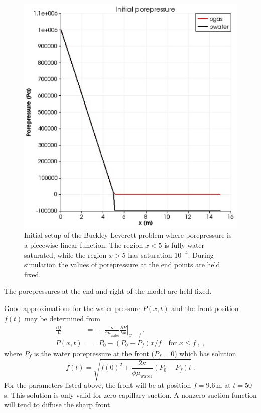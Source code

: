 \documentclass[]{scrreprt}
\begin{document}
\begin{figure}[htb]
\begin{center}
\includegraphics[width=12cm]{bl2_initial.eps}
\caption{Initial setup of the Buckley-Leverett problem where
  porepressure is a piecewise linear function.  The region
$x<5$ is fully water saturated, while the region $x>5$ has saturation
  $10^{-4}$.  During simulation the values of porepressure at the end
  points are held fixed.}
\label{bl2_setup.figa}
\end{center}
\end{figure}

The porepressures at the end and right of the model are held fixed.

Good approximations for the water pressure $P(x,t)$
and the front position $f(t)$ may be determined from
\begin{eqnarray}
\frac{{\mathrm d} f}{{\mathrm d} t} & = & -\frac{\kappa}{\phi\mu_{\mathrm{water}}}
\left.\frac{\partial  P}{\partial x}\right|_{x = f} \ , \nonumber \\
P(x,t) & = & P_{0} - (P_{0}-P_{f})x/f \ \ \ \mbox{ for } x\leq f  \ ,
\ ,
\label{eqn.predicted.bl2.posn.eqna}
\end{eqnarray}
where $P_{f}$ is the water porepressure at the front ($P_{f}=0$)
which has solution
\begin{equation}
f(t) = \sqrt{f(0)^{2} + \frac{2\kappa}{\phi\mu_{\mathrm{water}}}(P_{0}-P_{f})t} \ .
\end{equation}
For the parameters listed above, the front will be at position
$f=9.6$\,m at $t=50$\,s.  This solution is only valid for zero
capillary suction.  A nonzero suction function will tend to diffuse
the sharp front.
\end{document}
